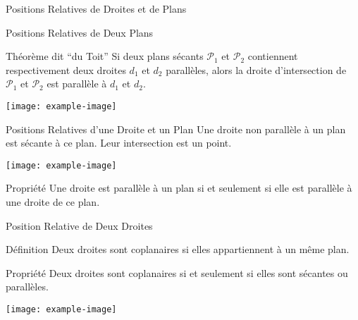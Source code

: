 \documentclass{cours}
\begin{document}
\begin{Gpartie}{Positions Relatives de Droites et de Plans}
\begin{Spartie}{Positions Relatives de Deux Plans}
\begin{SSpartie}{Théorème dit ``du Toit''}
                Si deux plans sécants $\mathcal{P}_1$ et $\mathcal{P}_2$ contiennent respectivement deux droites $d_1$ et $d_2$ parallèles, alors la droite d'intersection de $\mathcal{P}_1$ et $\mathcal{P}_2$ est parallèle à $d_1$ et $d_2$.
                \begin{center}
                        \texttt{[image: example-image]}
                    \parbox{\linewidth}{}
                \end{center}
            \end{SSpartie}
        \end{Spartie}
        \begin{Spartie}{Positions Relatives d'une Droite et un Plan} 
            Une droite non parallèle à un plan est sécante à ce plan. Leur intersection est un point.
            \begin{center}
                    \texttt{[image: example-image]}
                \parbox{\linewidth}{}
            \end{center}
            \begin{SSpartie}{Propriété} 
                Une droite est parallèle à un plan si et seulement si elle est parallèle à une droite de ce plan.
            \end{SSpartie}
        \end{Spartie}
        \begin{Spartie}{Position Relative de Deux Droites} 
            \begin{SSpartie}{Définition} 
                Deux droites sont coplanaires si elles appartiennent à un même plan.
            \end{SSpartie}
            \begin{SSpartie}{Propriété} 
                Deux droites sont coplanaires si et seulement si elles sont sécantes ou parallèles.
                \begin{center}
                        \texttt{[image: example-image]}

\end{center}
\end{SSpartie}
\end{Spartie}
\end{Gpartie}
\end{document}
